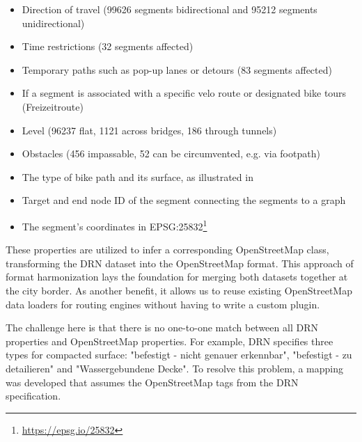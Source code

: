 \begin{itemize}
    \item Direction of travel (99626 segments bidirectional and 95212 segments unidirectional)
    \item Time restrictions (32 segments affected)
    \item Temporary paths such as pop-up lanes or detours (83 segments affected)
    \item If a segment is associated with a specific velo route or designated bike tours (Freizeitroute)
    \item Level (96237 flat, 1121 across bridges, 186 through tunnels)
    \item Obstacles (456 impassable, 52 can be circumvented, e.g. via footpath)
    \item The type of bike path and its surface, as illustrated in 
    \item Target and end node ID of the segment connecting the segments to a graph
    \item The segment's coordinates in EPSG:25832\footnote{\url{https://epsg.io/25832}}
\end{itemize}

These properties are utilized to infer a corresponding OpenStreetMap class, transforming the DRN dataset into the OpenStreetMap format. This approach of format harmonization lays the foundation for merging both datasets together at the city border. As another benefit, it allows us to reuse existing OpenStreetMap data loaders for routing engines without having to write a custom plugin.

The challenge here is that there is no one-to-one match between all DRN properties and OpenStreetMap properties. For example, DRN specifies three types for compacted surface: "befestigt - nicht genauer erkennbar", "befestigt - zu detailieren" and "Wassergebundene Decke". To resolve this problem, a mapping was developed that assumes the OpenStreetMap tags from the DRN specification. 


